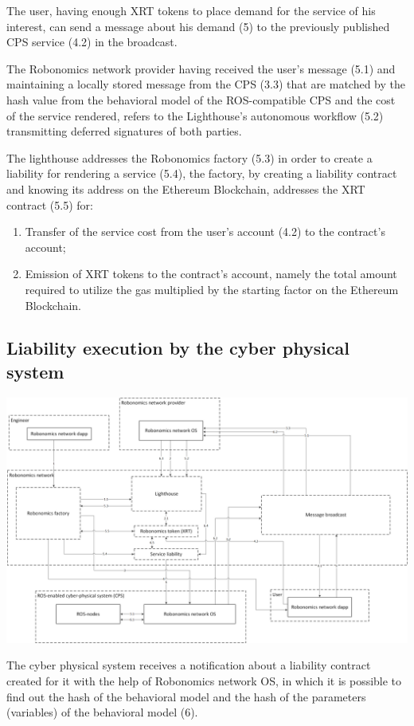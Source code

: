 \documentclass{article}
\begin{document}
The user, having enough XRT tokens to place demand for the service of his interest, can send a message about his demand (5) to the previously published CPS service (4.2) in the broadcast.

The Robonomics network provider having received the user's message (5.1) and maintaining a locally stored message from the CPS (3.3) that are matched by the hash value from the behavioral model of the ROS-compatible CPS and the cost of the service rendered, refers to the Lighthouse's autonomous workflow (5.2) transmitting deferred signatures of both parties.

The lighthouse addresses the Robonomics factory (5.3) in order to create a liability for rendering a service (5.4), the factory, by creating a liability contract and knowing its address on the Ethereum Blockchain, addresses the XRT contract  (5.5) for:
\begin{enumerate}
	\item Transfer of the service cost from the user's account (4.2) to the contract's account;
	\item Emission of XRT tokens to the contract's account, namely the total amount required to utilize the gas multiplied by the starting factor on the Ethereum Blockchain.
\end{enumerate}

\subsection{Liability execution by the cyber physical system}

\includegraphics[width=1\textwidth]{step-by-step-6.png} 

The cyber physical system receives a notification about a liability contract created for it with the help of Robonomics network OS, in which it is possible to find out the hash of the behavioral model and the hash of the parameters (variables) of the behavioral model (6).
\end{document}
